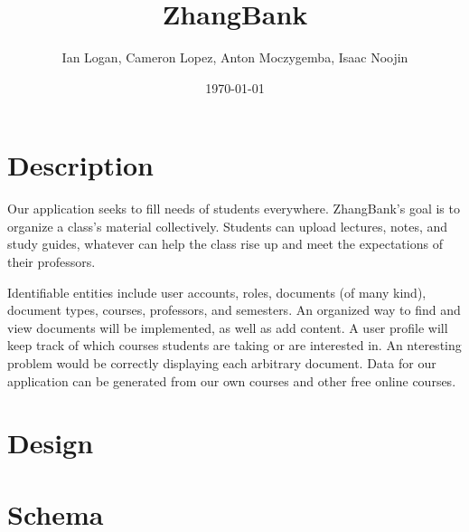 \documentclass[11pt]{article}
\title{ZhangBank}
\author{Ian Logan, Cameron Lopez, Anton Moczygemba, Isaac Noojin}
\date{\today}
\begin{document}
\maketitle


\section*{Description}
\label{sec-1}


  Our application seeks to fill needs of students
  everywhere. ZhangBank's goal is to organize a class's material
  collectively. Students can upload lectures, notes, and study guides,
  whatever can help the class rise up and meet the expectations of
  their professors.

  Identifiable entities include user accounts, roles, documents (of
  many kind), document types, courses, professors, and semesters. An
  organized way to find and view documents will be implemented, as
  well as add content. A user profile will keep track of which courses
  students are taking or are interested in. An nteresting problem
  would be correctly displaying each arbitrary document. Data for our
  application can be generated from our own courses and other free
  online courses.
\section*{Design}
\label{sec-2}
\section*{Schema}
\label{sec-3}
\end{document}
